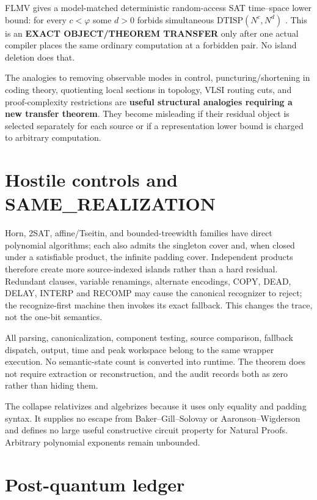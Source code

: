\documentclass[11pt]{article}
\begin{document}
FLMV gives a model-matched deterministic random-access SAT time--space lower
bound: for every $c<\varphi$ some $d>0$ forbids simultaneous
$\mathrm{DTISP}(N^c,N^d)$ \cite{flmv}.  This is an
\textbf{EXACT OBJECT/THEOREM TRANSFER} only after one actual compiler places
the same ordinary computation at a forbidden pair.  No island deletion does
that.

The analogies to removing observable modes in control, puncturing/shortening
in coding theory, quotienting local sections in topology, VLSI routing cuts,
and proof-complexity restrictions are \textbf{useful structural analogies
requiring a new transfer theorem}.  They become misleading if their residual
object is selected separately for each source or if a representation lower
bound is charged to arbitrary computation.

\section{Hostile controls and SAME\_REALIZATION}

Horn, 2SAT, affine/Tseitin, and bounded-treewidth families have direct
polynomial algorithms; each also admits the singleton cover and, when closed
under a satisfiable product, the infinite padding cover.  Independent
products therefore create more source-indexed islands rather than a hard
residual.  Redundant clauses, variable renamings, alternate encodings, COPY,
DEAD, DELAY, INTERP and RECOMP may cause the canonical recognizer to reject;
the recognize-first machine then invokes its exact fallback.  This changes
the trace, not the one-bit semantics.

All parsing, canonicalization, component testing, source comparison, fallback
dispatch, output, time and peak workspace belong to the same wrapper
execution.  No semantic-state count is converted into runtime.  The theorem
does not require extraction or reconstruction, and the audit records both as
zero rather than hiding them.

The collapse relativizes and algebrizes because it uses only equality and
padding syntax.  It supplies no escape from Baker--Gill--Solovay or
Aaronson--Wigderson and defines no large useful constructive circuit property
for Natural Proofs.  Arbitrary polynomial exponents remain unbounded.

\section{Post-quantum ledger}
\end{document}
